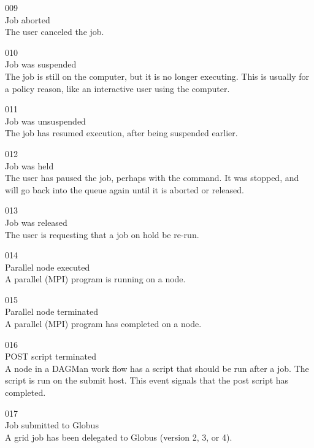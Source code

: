 \noindent{} 009 \\
 Job aborted \\
 The user canceled the job.

\noindent{} 010 \\
 Job was suspended \\
 The job is still on the computer, but it is no longer
executing. 
This is usually for a policy reason, like an interactive user using
the computer. 

\noindent{} 011 \\
 Job was unsuspended \\
 The job has resumed execution, after being
suspended earlier. 

\noindent{} 012 \\
 Job was held \\
 The user has paused the job, perhaps with
the  command.
It was stopped, and will go back into the queue again until it is
aborted or released. 

\noindent{} 013 \\
 Job was released \\
 The user is requesting that a job on hold be re-run.

\noindent{} 014 \\
 Parallel node executed \\
 A parallel (MPI) program is running on a node.

\noindent{} 015 \\
 Parallel node terminated \\
 A parallel (MPI) program has completed on a node.

\noindent{} 016 \\
 POST script terminated \\
 A node in a DAGMan work flow has a script
that should be run after a job. 
The script is run on the submit host. 
This event signals that the post script has completed.

\noindent{} 017 \\
 Job submitted to Globus \\
 A grid job has been delegated to Globus
(version 2, 3, or 4).

